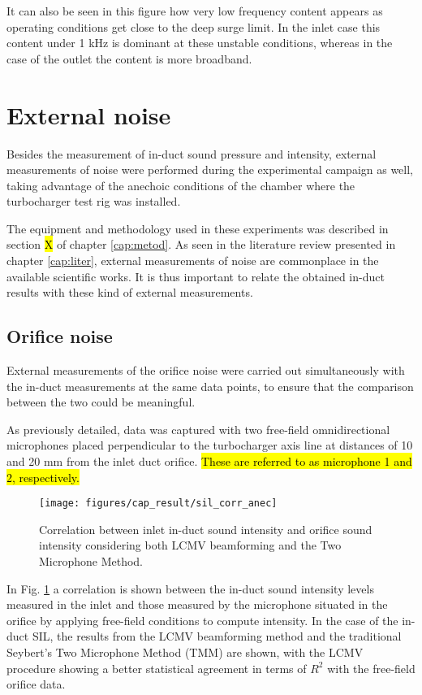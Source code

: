 It can also be seen in this figure how very low frequency content appears as operating conditions get close to the deep surge limit. In the inlet case this content under 1 kHz is dominant at these unstable conditions, whereas in the case of the outlet the content is more broadband. 

\section{External noise}
\label{sec:external_results}

Besides the measurement of in-duct sound pressure and intensity, external measurements of noise were performed during the experimental campaign as well, taking advantage of the anechoic conditions of the chamber where the turbocharger test rig was installed. 

The equipment and methodology used in these experiments was described in section \hl{X} of chapter \ref{cap:metod}. As seen in the literature review presented in chapter \ref{cap:liter}, external measurements of noise are commonplace in the available scientific works. It is thus important to relate the obtained in-duct results with these kind of external measurements.

\subsection{Orifice noise}

External measurements of the orifice noise were carried out simultaneously with the in-duct measurements at the same data points, to ensure that the comparison between the two could be meaningful. 

As previously detailed, data was captured with two free-field omnidirectional microphones placed perpendicular to the turbocharger axis line at distances of 10 and 20 mm from the inlet duct orifice. \hl{These are referred to as microphone 1 and 2, respectively.}

\begin{figure}[tbh!]
\centering
\texttt{[image: figures/cap\_result/sil\_corr\_anec]}
\caption{Correlation between inlet in-duct sound intensity and orifice sound intensity considering both LCMV beamforming and the Two Microphone Method.}
\label{fig:sil_corr_aneic}
\end{figure}

In Fig. \ref{fig:sil_corr_aneic} a correlation is shown between the  in-duct sound intensity levels measured in the inlet and those measured by the microphone situated in the orifice by applying free-field conditions to compute intensity. In the case of the in-duct SIL, the results from the LCMV beamforming method and the traditional Seybert's \cite{seybert1988two} Two Microphone Method (TMM) are shown, with the LCMV procedure showing a better statistical agreement in terms of $R^2$ with the free-field orifice data.

